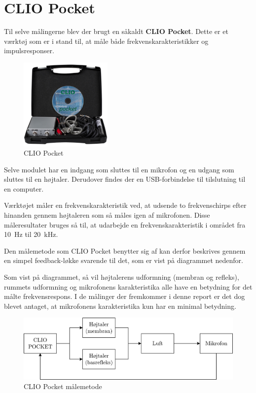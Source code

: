 \section{CLIO Pocket}
Til selve målingerne blev der brugt en såkaldt \textbf{CLIO Pocket}. Dette er et værktøj som er i stand til, at måle både frekvenskarakteristikker og impulsresponser.

\begin{figure} 
	\vspace{-20pt}
	\begin{center}
		\includegraphics[width=0.4\textwidth]{Billeder/ClioPocket}
	\end{center}
	\caption{CLIO Pocket}
	\vspace{-20pt}
\end{figure}
Selve modulet har en indgang som sluttes til en mikrofon og en udgang som sluttes til en højtaler. Derudover findes der en USB-forbindelse til tilslutning til en computer.

Værktøjet måler en frekvenskarakteristik ved, at udsende to frekvenschirps efter hinanden gennem højtaleren som så måles igen af mikrofonen. Disse måleresultater bruges så til, at udarbejde en frekvenskarakteristik i området fra \SI{10}{\hertz} til \SI{20}{\kilo\hertz}.

Den målemetode som CLIO Pocket benytter sig af kan derfor beskrives gennem en simpel feedback-løkke svarende til det, som er vist på diagrammet nedenfor.

Som vist på diagrammet, så vil højtalerens udformning (membran og refleks), rummets udformning og mikrofonens karakteristika alle have en betydning for det målte frekvensrespons. I de målinger der fremkommer i denne report er det dog blevet antaget, at mikrofonens karakteristika kun har en minimal betydning. 

\begin{figure}[H]
	\centering
	\includegraphics[width=\textwidth]{Billeder/CLIOFeedback}
	\caption{CLIO Pocket målemetode}
	\label{fig:ClioFeedback}
\end{figure}